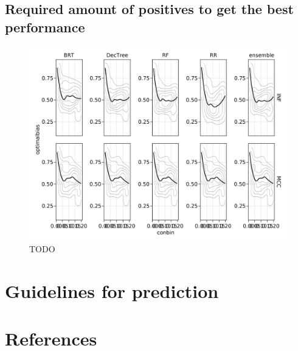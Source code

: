 \documentclass[11pt]{article}
\makeatletter
\def\maxwidth{\ifdim\Gin@nat@width>\linewidth\linewidth
\else\Gin@nat@width\fi}
\let\Oldincludegraphics\includegraphics
\renewcommand{\includegraphics}[1]{\Oldincludegraphics[width=\maxwidth]{#1}}
\makeatother
\begin{document}
\hypertarget{required-amount-of-positives-to-get-the-best-performance}{%
\subsection{Required amount of positives to get the best
performance}\label{required-amount-of-positives-to-get-the-best-performance}}

\begin{figure}
\hypertarget{fig:optimbias}{%
\centering
\includegraphics{figures/optim_mcc_inf.png}
\caption{TODO}\label{fig:optimbias}
}
\end{figure}

\hypertarget{guidelines-for-prediction}{%
\section{Guidelines for prediction}\label{guidelines-for-prediction}}

\hypertarget{references}{%
\section*{References}\label{references}}
\end{document}
